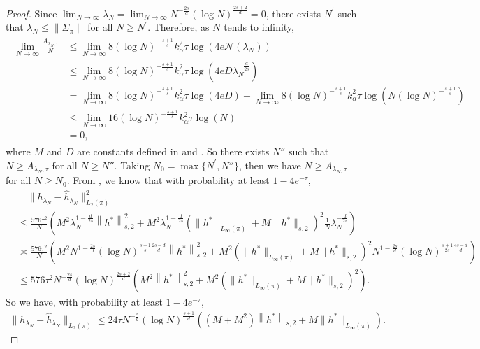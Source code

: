 \begin{proof}
Since $\lim_{N \to \infty} \lambda_N = \lim_{N \to \infty} N^{-\frac{2s}{d}} (\log N)^{\frac{2s+2}{d}} = 0$, there exists $N^\prime$ such that $\lambda_N \leq \| \Sigma_\pi \|$ for all $N \geq N^\prime$. 
Therefore, as $N$ tends to infinity,
\begin{align}\label{eq:ratio_N_A}
\begin{aligned}
    \lim_{N \to \infty} \frac{A_{\lambda_N, \tau}}{N} &\leq \lim_{N \to \infty} 8 (\log N)^{- \frac{s+1}{s}} k_{\alpha}^2 \tau \log \left(4 e \mathcal{N}(\lambda_N) \right) \\
    &\leq \lim_{N \to \infty} 8 (\log N)^{- \frac{s+1}{s}} k_{\alpha}^2 \tau \log \left(4 e D \lambda_N^{-\frac{d}{2s}} \right) \\
    &= \lim_{N \to \infty} 8 (\log N)^{- \frac{s+1}{s}} k_{\alpha}^2 \tau \log \left(4 e D \right)  + \lim_{N \to \infty} 8 (\log N)^{- \frac{s+1}{s}} k_{\alpha}^2 \tau \log \left( N (\log N)^{-\frac{s+1}{s}} \right)  \\
    &\leq \lim_{N \to \infty} 16 (\log N)^{- \frac{s+1}{s}} k_{\alpha}^2 \tau \log \left( N \right) \\
    &= 0,
\end{aligned}
\end{align}
where $M$ and $D$ are constants defined in  and . 
So there exists $N''$ such that $N \geq A_{\lambda_N, \tau}$ for all $N \geq N''$. Taking $N_0 = \max \{ N^\prime, N'' \}$, then we have $N \geq A_{\lambda_N, \tau}$ for all $N \geq N_0$. From , we know that with probability at least $1 - 4e^{-\tau}$, 
\begin{align*}
    &\quad \| h_{\lambda_N} - \hat{h}_{\lambda_N} \|_{L_2(\pi)}^2 \\ &\leq \frac{576 \tau^2}{N} \left( M^2 \lambda_N^{1 - \frac{d}{2s}} \left\| h^\ast \right \|_{s,2}^2  + M^2 \lambda_N^{1 - \frac{d}{2s} } \left( \|h^\ast \|_{L_\infty(\pi)} + M \| h^\ast  \|_{s,2} \right)^2 \frac{1}{N} \lambda_N^{-\frac{d}{2s}} \right) \\
    &\asymp \frac{576 \tau^2}{N} \left( M^2 N^{1 - \frac{2s}{d}} (\log N)^{\frac{s+1}{s} \frac{2s-d}{d}} \left\| h^\ast \right \|_{s,2}^2  + M^2 \left( \|h^\ast \|_{L_\infty(\pi)} + M \| h^\ast  \|_{s,2} \right)^2 N^{1 -\frac{2s}{d}} (\log N)^{\frac{s+1}{2s} \frac{4s-d}{d}} \right) \\
    &\leq 576 \tau^2 N^{-\frac{2s}{d}} (\log N)^{\frac{2s+2}{d} } \left( M^2 \left\| h^\ast \right \|_{s,2}^2  + M^2 \left( \|h^\ast \|_{L_\infty(\pi)} + M \| h^\ast  \|_{s,2} \right)^2  \right) .
\end{align*}
So we have, with probability at least $1 - 4e^{-\tau}$, 
\begin{align*}
    \| h_{\lambda_N} - \hat{h}_{\lambda_N} \|_{L_2(\pi)} \leq 24 \tau N^{-\frac{s}{d}} (\log N)^{\frac{s+1}{d} } \left( (M + M^2) \left\| h^\ast \right \|_{s,2} + M \|h^\ast \|_{L_\infty(\pi)} \right).
\end{align*}

\end{proof}
